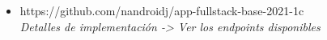 \begin{itemize}

  
  \item https://github.com/nandroidj/app-fullstack-base-2021-1c
    \\ \textit{Detalles de implementación -> Ver los endpoints disponibles}



\end{itemize}

